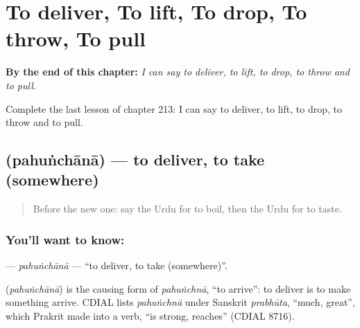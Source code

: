 
\chapter{To deliver, To lift, To drop, To throw, To pull}
\label{ch:ur-to-deliver-to-lift-to-drop-to-throw-to-pull}

\begin{chapteropening}
\textbf{By the end of this chapter:} \emph{I can say to deliver, to lift, to drop, to throw and to pull.}

Complete the last lesson of chapter 213: I can say to deliver, to lift, to drop, to throw and to pull.
\end{chapteropening}

\section[\texorpdfstring{\ur{پہنچانا} (pahuṅchānā)}{پہنچانا (pahuṅchānā)}]{ (pahuṅchānā) — to deliver, to take (somewhere)}

\label{lesson:UR-C213-pahunchana}



\begin{quote}
Before the new one: say the Urdu for to boil, then the Urdu for to taste.
\end{quote}

\subsection*{You'll want to know: }
\textbf{} — \emph{pahuṅchānā} — \textquotedblleft{}to deliver, to take (somewhere)\textquotedblright{}.

\begin{cousinweb}
\textbf{} (\emph{pahuṅchānā}) is the causing form of \emph{pahuṅchnā}, \textquotedblleft{}to arrive\textquotedblright{}: to deliver is to make something arrive. CDIAL lists \emph{pahuṅchnā} under Sanskrit \emph{prabhūta}, \textquotedblleft{}much, great\textquotedblright{}, which Prakrit made into a verb, \textquotedblleft{}is strong, reaches\textquotedblright{} (CDIAL 8716).
\end{cousinweb}

